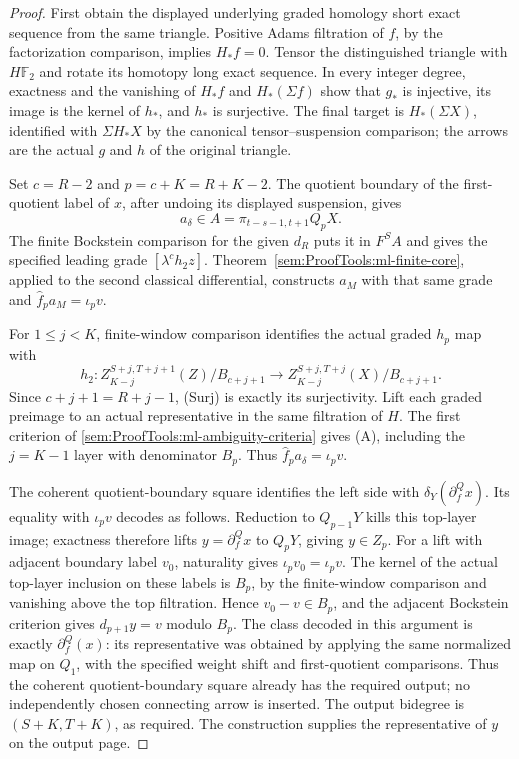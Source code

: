 \begin{proof}
First obtain the displayed underlying graded homology short exact
sequence from the same triangle. Positive Adams filtration of $f$,
by the factorization comparison, implies $H_*f=0$.
Tensor the distinguished triangle with $H\mathbb F_2$ and rotate its
homotopy long exact sequence. In every integer degree, exactness
and the vanishing of $H_*f$ and $H_*(\Sigma f)$ show that $g_*$ is
injective, its image is the kernel of $h_*$, and $h_*$ is surjective.
The final target is $H_*(\Sigma X)$, identified with $\Sigma H_*X$
by the canonical tensor--suspension comparison; the arrows are the
actual $g$ and $h$ of the original triangle.

Set $c=R-2$ and $p=c+K=R+K-2$. The quotient boundary of the
first-quotient label of $x$, after undoing its displayed suspension, gives
\[
 a_\delta\in A=\pi_{t-s-1,t+1}Q_pX.
\]
The finite Bockstein comparison for the given $d_R$ puts it in $F^SA$
and gives the specified leading grade $[\lambda^ch_2z]$.
Theorem~\ref{sem:ProofTools:ml-finite-core}, applied to the second
classical differential, constructs $a_M$ with that same grade and
$\widehat f_pa_M=\iota_pv$.

For $1\leq j<K$, finite-window comparison identifies the actual graded
$h_p$ map with
\[
 h_2:Z_{K-j}^{S+j,T+j+1}(Z)/B_{c+j+1}
       \longrightarrow Z_{K-j}^{S+j,T+j}(X)/B_{c+j+1}.
\]
Since $c+j+1=R+j-1$, (Surj) is exactly its surjectivity.
Lift each graded preimage to an actual representative in the same
filtration of $H$. The first criterion of
\ref{sem:ProofTools:ml-ambiguity-criteria} gives (A), including the
$j=K-1$ layer with denominator $B_p$. Thus
$\widehat f_pa_\delta=\iota_pv$.

The coherent quotient-boundary square identifies the left side with
$\delta_Y(\partial^Q_fx)$. Its equality with $\iota_pv$ decodes as
follows. Reduction to $Q_{p-1}Y$ kills this top-layer image; exactness
therefore lifts $y=\partial^Q_fx$ to $Q_pY$, giving $y\in Z_p$.
For a lift with adjacent boundary label $v_0$, naturality gives
$\iota_pv_0=\iota_pv$. The kernel of the actual top-layer inclusion
on these labels is $B_p$, by the finite-window comparison and vanishing
above the top filtration. Hence $v_0-v\in B_p$, and the adjacent
Bockstein criterion gives $d_{p+1}y=v$ modulo $B_p$.
The class decoded in this argument is exactly $\partial^Q_f(x)$:
its representative was obtained by applying the same normalized
map on $Q_1$, with the specified weight shift and first-quotient
comparisons. Thus the coherent quotient-boundary square already has
the required output; no independently chosen connecting arrow is inserted.
The output bidegree is $(S+K,T+K)$, as required.
The construction supplies the representative of $y$ on the output page.
\end{proof}

